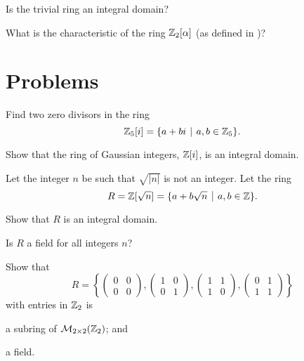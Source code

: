 \begin{exercise}\label{exercise-trivial-ring-is-not-an-integral-domain}
    Is the trivial ring an integral domain?
\end{exercise}
\begin{exercise}
    What is the characteristic of the ring $\mathbb{Z}_2[\alpha]$ (as defined in )?
\end{exercise}

\newpage

\section{Problems}
\begin{problem}
    Find two zero divisors in the ring
    \[
        \Z_5[i] = \{a + bi \vert a,b\in\Z_5\}.
    \]
\end{problem}

\begin{problem}
    Show that the ring of Gaussian integers, $\mathbb{Z}[i]$, is an integral domain.
\end{problem}

\begin{problem}
    Let the integer $n$ be such that $\sqrt{|n|}$ is not an integer. Let the ring
    \[
        R = \Z[\sqrt{n}] = \{a + b\sqrt{n} \vert a,b\in \Z\}.
    \]
    \begin{partquestions}{\alph*}
        \item Show that $R$ is an integral domain.
        \item Is $R$ a field for all integers $n$?
    \end{partquestions}
\end{problem}

\begin{problem}
    Show that
    \[
        R = \left\{\begin{pmatrix}0&0\\0&0\end{pmatrix},\begin{pmatrix}1&0\\0&1\end{pmatrix},\begin{pmatrix}1&1\\1&0\end{pmatrix},\begin{pmatrix}0&1\\1&1\end{pmatrix}\right\}
    \]
    with entries in $\mathbb{Z}_2$ is
    \begin{partquestions}{\roman*}
        \item a subring of $\mathcal{M}_{2\times2}(\mathbb{Z}_2)$; and
        \item a field.
    \end{partquestions}
\end{problem}
